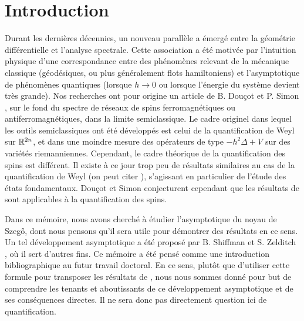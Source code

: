 \chapter*{Introduction}
Durant les dernières décennies, un nouveau parallèle a émergé entre la
géométrie différentielle et l'analyse spectrale. Cette association a
été motivée par l'intuition physique d'une correspondance entre des
phénomènes relevant de la mécanique classique (géodésiques, ou plus
généralement flots hamiltoniens) et l'asymptotique de phénomènes
quantiques (lorsque $h \to 0$ ou lorsque l'énergie du système devient
très grande). Nos recherches ont pour origine un article de B. Douçot
et P. Simon \cite{douccot1998semiclassical}, sur le fond du spectre
de réseaux de spins ferromagnétiques ou
antiferromagnétiques, dans la limite semiclassique. Le cadre originel dans lequel les outils
semiclassiques ont été développés \cite{helffer1988semi,
zworski2012semiclassical} est celui de la quantification de Weyl
sur $\mathbb{R}^{2n}$, et dans une moindre mesure des opérateurs de type
$-h^2\Delta + V$ sur des variétés riemanniennes. Cependant, le cadre
théorique de la quantification des spins \cite{ma2012berezin,
  borthwick2000introduction} est différent. Il existe à ce jour trop
peu de résultats similaires au cas de la quantification de Weyl (on
peut citer \cite{borthwick1998semiclassical}), s'agissant en
particulier de l'étude des états fondamentaux. Douçot et Simon
conjecturent cependant que les résultats de
\cite{helffer1988semi} sont applicables à la quantification des spins. 

Dans ce mémoire, nous avons cherché à étudier l'asymptotique du noyau
de Szeg\H{o}, dont nous pensons qu'il sera utile pour démontrer des
résultats en ce sens. Un tel développement asymptotique a été proposé
par B. Shiffman et S. Zelditch \cite{Zelditch2000, Shiffman2002}, où il sert d'autres fins. Ce mémoire a été pensé comme une introduction bibliographique au futur travail doctoral. En ce sens, plutôt que d'utiliser cette formule pour transposer les résultats de \cite{helffer1988semi}, nous nous sommes donné pour but de comprendre les tenants et aboutissants de ce développement asymptotique et de ses conséquences directes. Il ne sera donc pas directement question ici de quantification.


